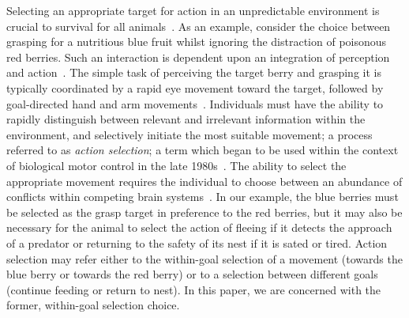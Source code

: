 \documentclass[10pt,letterpaper]{article}
\begin{document}
Selecting an appropriate target for action in an unpredictable
environment is crucial to survival for all
animals~\cite{cisek_cortical_2007,pratt_action-centered_1994}. As an
example, consider the choice between grasping for a nutritious blue
fruit whilst ignoring the distraction of poisonous red berries. Such
an interaction is dependent upon an integration of perception and
action~\cite{tipper_actionbased_1998}. The simple task of perceiving
the target berry and grasping it is typically coordinated by a rapid
eye movement toward the target, followed by goal-directed hand and arm
movements~\cite{biguer_coordination_1982,neggers_ocular_2000,neggers_gaze_2001}.
Individuals must have the ability to rapidly distinguish between
relevant and irrelevant information within the environment, and
selectively initiate the most suitable movement; a process referred to
as \emph{action selection}; a term which began to be used within the
context of biological motor control in the late
1980s~\cite{norman_attention_1986,maes_dynamics_1989,maes_situated_1990}. The
ability to select the appropriate movement requires the individual to
choose between an abundance of conflicts within competing brain
systems~\cite{redgrave_basal_1999}. In our example, the blue berries
must be selected as the grasp target in preference to the red berries,
but it may also be necessary for the animal to select the action of
fleeing if it detects the approach of a predator or returning to the
safety of its nest if it is sated or tired. Action selection may refer
either to the within-goal selection of a movement (towards the blue
berry or towards the red berry) or to a selection between different
goals (continue feeding or return to nest). In this paper, we are
concerned with the former, within-goal selection choice.
\end{document}
